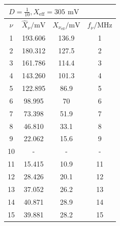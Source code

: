 \documentclass[a4paper, 12pt]{article}
\begin{document}
\begin{center}
          \bgroup
          \def\arraystretch{1.6180339887498948}
            \begin{tabular}{@{}cccc@{}}
            \toprule
            \multicolumn{3}{c}{$D = \frac{1}{10}, X_{\text{eff}} = 305 \,\ \si{\milli\volt}$} \\ \midrule
            $\nu$      & $\hat{X}_\nu / \si{\milli\volt}$   & $X_{\nu_{\text{eff}}} / \si{\milli\volt}$ & $f_\nu / \si{\mega\hertz}$ \\ \hline
              1  & 193.606     & 136.9      & 1        \\
              2  & 180.312     & 127.5      & 2        \\
              3  & 161.786     & 114.4      & 3        \\
              4  & 143.260     & 101.3      & 4        \\
              5  & 122.895     & 86.9       & 5        \\
              6  & 98.995      & 70         & 6        \\
              7  & 73.398      & 51.9       & 7        \\
              8  & 46.810      & 33.1       & 8        \\
              9  & 22.062      & 15.6       & 9        \\
              10 & -           & -          & -        \\
              11 & 15.415      & 10.9       & 11       \\
              12 & 28.426      & 20.1       & 12       \\
              13 & 37.052      & 26.2       & 13       \\
              14 & 40.871      & 28.9       & 14       \\
              15 & 39.881      & 28.2       & 15       \\ \bottomrule
            \end{tabular}
            \egroup
    \end{center}
\end{document}
